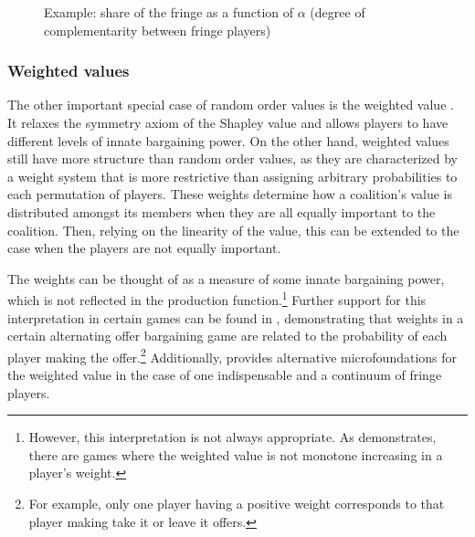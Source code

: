 \begin{figure}
    \centering
    \caption{Example: share of the fringe as a function of $\alpha$ (degree of complementarity between fringe players)}
    \label{fig:power_function_example}
\end{figure}


\subsubsection{Weighted values}
\label{sec:weighted_one_sided}

The other important special case of random order values is the weighted value \parencite{shapley1953additive}.
It relaxes the symmetry axiom of the Shapley value and allows players to have different levels of innate bargaining power.
On the other hand, weighted values still have more structure than random order values, as they are characterized by a weight system that is more restrictive than assigning arbitrary probabilities to each permutation of players.
These weights determine how a coalition's value is distributed amongst its members when they are all equally important to the coalition.
Then, relying on the linearity of the value, this can be extended to the case when the players are not equally important.

The weights can be thought of as a measure of some innate bargaining power, which is not reflected in the production function.\footnote{
    However, this interpretation is not always appropriate.
    As \textcite{owen1968communications} demonstrates, there are games where the weighted value is not monotone increasing in a player's weight.
}
Further support for this interpretation in certain games can be found in \textcite{hart1996bargaining}, demonstrating that weights in a certain alternating offer bargaining game are related to the probability of each player making the offer.\footnote{
    For example, only one player having a positive weight corresponds to that player making take it or leave it offers.
}
Additionally, \textcite{stole1996intra} provides alternative microfoundations for the weighted value in the case of one indispensable and a continuum of fringe players.

